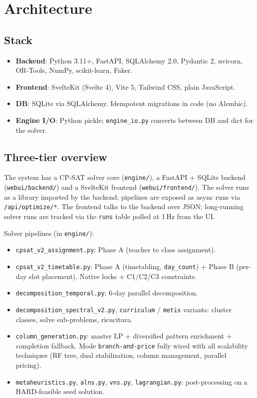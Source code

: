 \chapter{Architecture}
\label{ch:architettura_en}

\section{Stack}

\begin{itemize}[leftmargin=*]
  \item \textbf{Backend}: Python 3.11+, FastAPI, SQLAlchemy 2.0,
        Pydantic 2, uvicorn, OR-Tools, NumPy, scikit-learn, Faker.
  \item \textbf{Frontend}: SvelteKit (Svelte 4), Vite 5, Tailwind
        CSS, plain JavaScript.
  \item \textbf{DB}: SQLite via SQLAlchemy. Idempotent migrations
        in code (no Alembic).
  \item \textbf{Engine I/O}: Python pickle;
        \texttt{engine\_io.py} converts between DB and dict for
        the solver.
\end{itemize}

\section{Three-tier overview}

The system has a CP-SAT solver core (\texttt{engine/}), a
FastAPI + SQLite backend (\texttt{webui/backend/}) and a
SvelteKit frontend (\texttt{webui/frontend/}). The solver runs
as a library imported by the backend; pipelines are exposed as
async runs via \texttt{/api/optimize/*}. The frontend talks
to the backend over JSON; long-running solver runs are tracked
via the \texttt{runs} table polled at 1\,Hz from the UI.

Solver pipelines (in \texttt{engine/}):
\begin{itemize}
\item \texttt{cpsat\_v2\_assignment.py}: Phase A (teacher to
  class assignment).
\item \texttt{cpsat\_v2\_timetable.py}: Phase A (timetabling,
  \texttt{day\_count}) + Phase B (per-day slot placement).
  Native locks + C1/C2/C3 constraints.
\item \texttt{decomposition\_temporal.py}: 6-day parallel
  decomposition.
\item \texttt{decomposition\_spectral\_v2.py}, \texttt{curriculum}
  / \texttt{metis} variants: cluster classes, solve
  sub-problems, ricucitura.
\item \texttt{column\_generation.py}: master LP + diversified
  pattern enrichment + completion fallback. Mode
  \texttt{branch-and-price} fully wired with all scalability
  techniques (RF tree, dual stabilization, column management,
  parallel pricing).
\item \texttt{metaheuristics.py}, \texttt{alns.py},
  \texttt{vns.py}, \texttt{lagrangian.py}: post-processing on a
  HARD-feasible seed solution.
\end{itemize}

